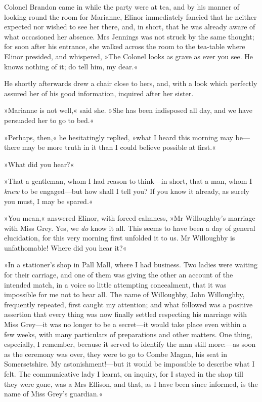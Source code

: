Colonel Brandon came in while the party were at tea, and by his manner of looking round the room for Marianne, Elinor immediately fancied that he neither expected nor wished to see her there, and, in short, that he was already aware of what occasioned her absence. Mrs Jennings was not struck by the same thought; for soon after his entrance, she walked across the room to the tea-table where Elinor presided, and whispered, »The Colonel looks as grave as ever you see. He knows nothing of it; do tell him, my dear.«

He shortly afterwards drew a chair close to hers, and, with a look which perfectly assured her of his good information, inquired after her sister.

»Marianne is not well,« said she. »She has been indisposed all day, and we have persuaded her to go to bed.«

»Perhaps, then,« he hesitatingly replied, »what I heard this morning may be—there may be more truth in it than I could believe possible at first.«

»What did you hear?«

»That a gentleman, whom I had reason to think—in short, that a man, whom I \textit{knew} to be engaged—but how shall I tell you? If you know it already, as surely you must, I may be spared.«

»You mean,« answered Elinor, with forced calmness, »Mr Willoughby’s marriage with Miss Grey. Yes, we \textit{do} know it all. This seems to have been a day of general elucidation, for this very morning first unfolded it to us. Mr Willoughby is unfathomable! Where did you hear it?«

»In a stationer’s shop in Pall Mall, where I had business. Two ladies were waiting for their carriage, and one of them was giving the other an account of the intended match, in a voice so little attempting concealment, that it was impossible for me not to hear all. The name of Willoughby, John Willoughby, frequently repeated, first caught my attention; and what followed was a positive assertion that every thing was now finally settled respecting his marriage with Miss Grey—it was no longer to be a secret—it would take place even within a few weeks, with many particulars of preparations and other matters. One thing, especially, I remember, because it served to identify the man still more:—as soon as the ceremony was over, they were to go to Combe Magna, his seat in Somersetshire. My astonishment!—but it would be impossible to describe what I felt. The communicative lady I learnt, on inquiry, for I stayed in the shop till they were gone, was a Mrs Ellison, and that, as I have been since informed, is the name of Miss Grey’s guardian.«

